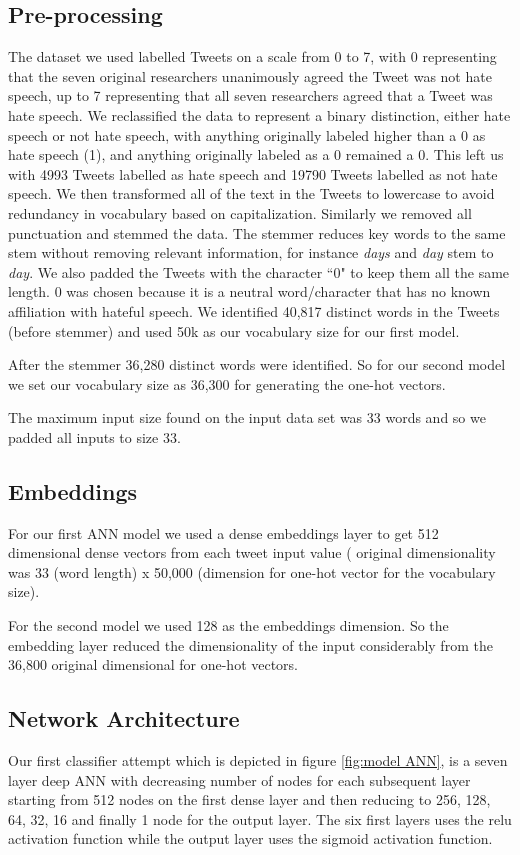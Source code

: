 \documentclass[conference]{sig-alternate-05-2015}
\begin{document}
\subsection{Pre-processing}
The dataset we used labelled Tweets on a scale from 0 to 7, with 0 representing that the seven original researchers unanimously agreed the Tweet was not hate speech, up to 7 representing that all seven researchers agreed that a Tweet was hate speech. We reclassified the data to represent a binary distinction, either hate speech or not hate speech, with anything originally labeled higher than a 0 as hate speech (1), and anything originally labeled as a 0 remained a 0. This left us with 4993 Tweets labelled as hate speech and 19790 Tweets labelled as not hate speech.
We then transformed all of the text in the Tweets to lowercase to avoid redundancy in vocabulary based on capitalization. 
Similarly we removed all punctuation and stemmed the data. The stemmer reduces key words to the same stem without removing relevant information, for instance \textit{days} and \textit{day} stem to \textit{day}.
We also padded the Tweets with the character ``0" to keep them all the same length. 0 was chosen because it is a neutral word/character that has no known affiliation with hateful speech.
We identified 40,817 distinct words in the Tweets (before stemmer) and used 50k as our vocabulary size for our first model.

After the stemmer  36,280 distinct words were identified. So for our second model we set our vocabulary size as 36,300 for generating the one-hot vectors.

The maximum input size found on the input data set was 33 words and so we padded all inputs to size 33.

\subsection{Embeddings}
For our first ANN model we used a dense embeddings layer to get 512 dimensional dense vectors from each tweet input value ( original dimensionality was 33 (word length) x 50,000 (dimension for one-hot vector for the vocabulary size).

For the second model we used 128 as the embeddings dimension. So the  embedding layer reduced the dimensionality of the input considerably from the 36,800 original dimensional for one-hot vectors.

\subsection{Network Architecture}
Our first classifier attempt which is depicted in figure \ref{fig:model ANN}, is a seven layer deep ANN with decreasing number of nodes for each subsequent layer starting from 512 nodes on the first dense layer and then reducing to 256, 128, 64, 32, 16 and finally 1 node for the output layer. The six first layers uses the relu activation function while the output layer uses the sigmoid activation function.
\end{document}
